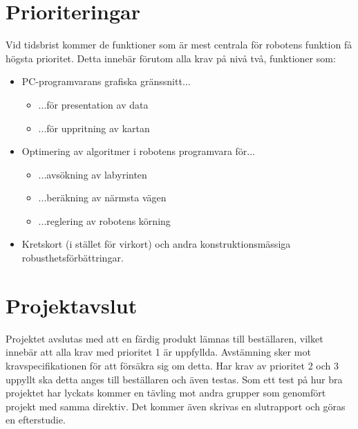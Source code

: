 \documentclass[11pt]{article}
\begin{document}
\begin{flushleft}
\section{Prioriteringar}
Vid tidsbrist kommer de funktioner som är mest centrala för robotens funktion få högsta prioritet. Detta innebär förutom alla krav på nivå två, funktioner som:
\begin{itemize}
	\item PC-programvarans grafiska gränssnitt... 
	\begin{itemize}	
		\item ...för presentation av data
		\item ...för uppritning av kartan
	\end{itemize}
	\item Optimering av algoritmer i robotens programvara för...
	\begin{itemize}
		\item ...avsökning av labyrinten
		\item ...beräkning av närmsta vägen
		\item ...reglering av robotens körning
	\end{itemize}
	\item Kretskort (i stället för virkort) och andra konstruktionsmässiga robusthetsförbättringar.
\end{itemize}

\pagebreak
\section{Projektavslut}
Projektet avslutas med att en färdig produkt lämnas till beställaren, vilket innebär att alla krav med prioritet 1 är uppfyllda. Avstämning sker mot kravspecifikationen för att försäkra sig om detta. Har krav av prioritet 2 och 3 uppyllt ska detta anges till beställaren och även testas. Som ett test på hur bra projektet har lyckats kommer en tävling mot andra grupper som genomfört projekt med samma direktiv. Det kommer även skrivas en slutrapport och göras en efterstudie. 

\end{flushleft}
\end{document}
